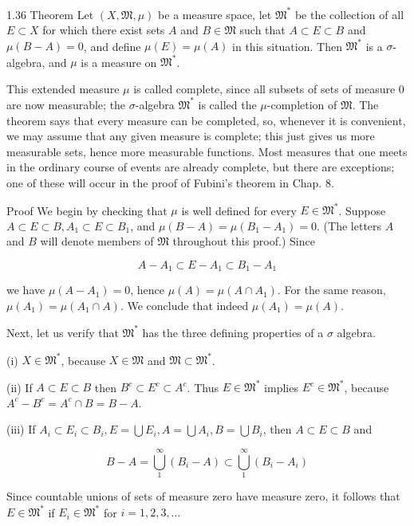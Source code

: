 \documentclass[10pt]{article}
\begin{document}
1.36 Theorem Let $(X, \mathfrak{M}, \mu)$ be a measure space, let $\mathfrak{M}^{*}$ be the collection of all $E \subset X$ for which there exist sets $A$ and $B \in \mathfrak{M}$ such that $A \subset E \subset B$ and $\mu(B-A)=0$, and define $\mu(E)=\mu(A)$ in this situation. Then $\mathfrak{M}^{*}$ is a $\sigma$-algebra, and $\mu$ is a measure on $\mathfrak{M}^{*}$.

This extended measure $\mu$ is called complete, since all subsets of sets of measure 0 are now measurable; the $\sigma$-algebra $\mathfrak{M}^{*}$ is called the $\mu$-completion of $\mathfrak{M}$. The theorem says that every measure can be completed, so, whenever it is convenient, we may assume that any given measure is complete; this just gives us more measurable sets, hence more measurable functions. Most measures that one meets in the ordinary course of events are already complete, but there are exceptions; one of these will occur in the proof of Fubini's theorem in Chap. 8.

Proof We begin by checking that $\mu$ is well defined for every $E \in \mathfrak{M}^{*}$. Suppose $A \subset E \subset B, A_{1} \subset E \subset B_{1}$, and $\mu(B-A)=\mu\left(B_{1}-A_{1}\right)=0$. (The letters $A$ and $B$ will denote members of $\mathfrak{M}$ throughout this proof.) Since

$$
A-A_{1} \subset E-A_{1} \subset B_{1}-A_{1}
$$

we have $\mu\left(A-A_{1}\right)=0$, hence $\mu(A)=\mu\left(A \cap A_{1}\right)$. For the same reason, $\mu\left(A_{1}\right)=\mu\left(A_{1} \cap A\right)$. We conclude that indeed $\mu\left(A_{1}\right)=\mu(A)$.

Next, let us verify that $\mathfrak{M}^{*}$ has the three defining properties of a $\sigma$ algebra.

(i) $X \in \mathfrak{M}^{*}$, because $X \in \mathfrak{M}$ and $\mathfrak{M} \subset \mathfrak{M}^{*}$.

(ii) If $A \subset E \subset B$ then $B^{c} \subset E^{c} \subset A^{c}$. Thus $E \in \mathfrak{M}^{*}$ implies $E^{c} \in \mathfrak{M}^{*}$, because $A^{c}-B^{c}=A^{c} \cap B=B-A$.

(iii) If $A_{i} \subset E_{i} \subset B_{i}, E=\bigcup E_{i}, A=\bigcup A_{i}, B=\bigcup B_{i}$, then $A \subset E \subset B$ and

$$
B-A=\bigcup_{1}^{\infty}\left(B_{i}-A\right) \subset \bigcup_{1}^{\infty}\left(B_{i}-A_{i}\right)
$$

Since countable unions of sets of measure zero have measure zero, it follows that $E \in \mathfrak{M}^{*}$ if $E_{i} \in \mathfrak{M}^{*}$ for $i=1,2,3, \ldots$
\end{document}
